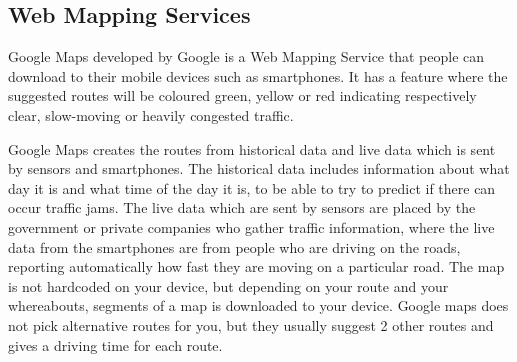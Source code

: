 \subsection*{Web Mapping Services}
%
Google Maps developed by Google is a Web Mapping Service that people can download to their mobile devices such as smartphones. It has a feature where the suggested routes will be coloured green, yellow or red indicating respectively clear, slow-moving or heavily congested traffic.

Google Maps creates the routes from historical data and live data which is sent by sensors and smartphones\cite{Googleabout}. The historical data includes information about what day it is and what time of the day it is, to be able to try to predict if there can occur traffic jams. The live data which are sent by sensors are placed by the government or private companies who gather traffic information, where the live data from the smartphones are from people who are driving on the roads, reporting automatically how fast they are moving on a particular road. The map is not hardcoded on your device, but depending on your route and your whereabouts, segments of a map is downloaded to your device. Google maps does not pick alternative routes for you, but they usually suggest 2 other routes and gives a driving time for each route\cite{Ncta}.


